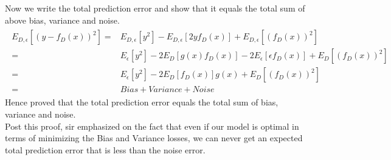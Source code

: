 \documentclass[12pt]{article}
\begin{document}
Now we write the total prediction error and show that it equals the total sum of above bias, variance and noise.
\begin{align}
\begin{split}\label{eq:5}
    E_{D,\epsilon}[(y-f_D(x))^2] ={}& E_{D,\epsilon}[y^2] - E_{D,\epsilon}[2yf_D(x)] + E_{D,\epsilon}[(f_D(x))^2] \\
    ={}& E_{\epsilon}[y^2] - 2E_{D}[g(x)f_D(x)] - 2E_{\epsilon}[\epsilon f_D(x)]+ E_{D}[(f_D(x))^2] \\
    ={}& E_{\epsilon}[y^2] - 2E_{D}[f_D(x)]g(x) + E_{D}[(f_D(x))^2] \\
    ={}& Bias + Variance + Noise
\end{split}
\end{align}
Hence proved that the total prediction error equals the total sum of bias, variance and noise. \\ Post this proof, sir emphasized on the fact that even if our model is optimal in terms of minimizing the Bias and Variance losses, we can never get an expected total prediction error that is less than the noise error. \\
\end{document}
